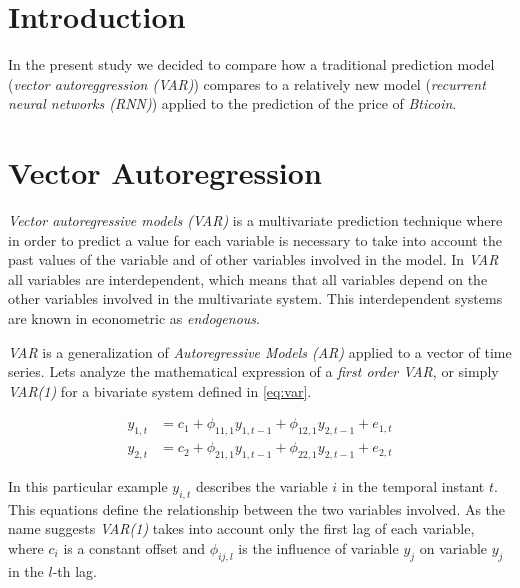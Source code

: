 
\chapter{Introduction}
\label{ch:mat_introduction}

In the present study we decided to compare how a traditional
prediction model (\textit{vector autoreggression (VAR)}) compares to a
relatively new model (\textit{recurrent neural networks (RNN)})
applied to the prediction of the price of \textit{Bticoin}.

\chapter{Vector Autoregression}
\label{ch:vector-autoregression}

\textit{Vector autoregressive models (VAR)} is a multivariate
prediction technique where in order to predict a value for each
variable is necessary to take into account the past values of the
variable and of other variables involved in the model. In \textit{VAR}
all variables are interdependent, which means that all variables
depend on the other variables involved in the multivariate system.
This interdependent systems are known in econometric as
\textit{endogenous}.

\textit{VAR} is a generalization of \textit{Autoregressive Models
(AR)} applied to a vector of time series. Lets analyze the
mathematical expression of a \textit{first order VAR}, or simply
\textit{VAR(1)} for a bivariate system defined in \autoref{eq:var}.

\begin{equation}
  \begin{aligned}
    \label{eq:var}
    y_{1,t} & = c_1 + \phi_{11,1} y_{1,t-1} + \phi_{12,1} y_{2,t-1} +
    e_{1,t} \\
    y_{2,t} & = c_2 + \phi_{21,1} y_{1,t-1} + \phi_{22,1} y_{2,t-1} +
    e_{2,t} 
  \end{aligned}
\end{equation}

In this particular example $y_{i, t}$ describes the variable $i$ in
the temporal instant $t$. This equations define the relationship
between the two variables involved. As the name suggests
\textit{VAR(1)} takes into account only the first lag of each
variable, where $c_i$ is a constant offset and $\phi_{ij,l}$ is the
influence of variable $y_j$ on variable $y_j$ in the $l$-th lag.

